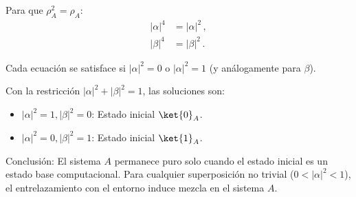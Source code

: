 \begin{questions}
\begin{solution}
\begin{parts}
      Para que $\rho_A^2 = \rho_A$:
      \begin{align*}
        |\alpha|^4 & = |\alpha|^2\,, \\
        |\beta|^4  & = |\beta|^2\,.
      \end{align*}

      Cada ecuación se satisface si $|\alpha|^2 = 0$ o $|\alpha|^2 = 1$ (y análogamente para $\beta$).

      Con la restricción $|\alpha|^2 + |\beta|^2 = 1$, las soluciones son:
      \begin{itemize}
        \item $|\alpha|^2 = 1, |\beta|^2 = 0$: Estado inicial $\ket{0}_A$.
        \item $|\alpha|^2 = 0, |\beta|^2 = 1$: Estado inicial $\ket{1}_A$.
      \end{itemize}

      Conclusión: El sistema $A$ permanece puro solo cuando el estado inicial es un estado base computacional. Para cualquier superposición no trivial ($0 < |\alpha|^2 < 1$), el entrelazamiento con el entorno induce mezcla en el sistema $A$.
    \end{parts}
  \end{solution}

\end{questions}